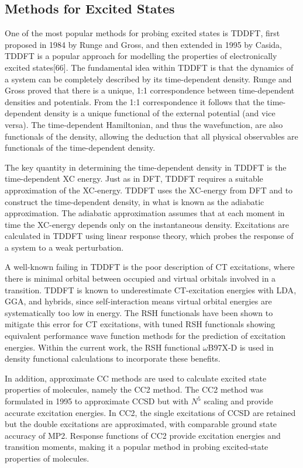 \subsection{Methods for Excited States}\label{section: photo_methods}
One of the most popular methods for probing excited states is \acf{TDDFT}, first proposed in 1984 by Runge and Gross, and then extended in 1995 by Casida, TDDFT is a popular approach for modelling the properties of electronically excited states[66]. The fundamental idea within TDDFT is that the dynamics of a system can be completely described by its time-dependent density. Runge and Gross proved that there is a unique, 1:1 correspondence between time-dependent densities and potentials.\cite{Runge1984}  From the 1:1 correspondence it follows that the time-dependent density is a unique functional of the external potential (and vice versa). The time-dependent Hamiltonian, and thus the wavefunction, are also functionals of the density, allowing the deduction that all physical observables are functionals of the time-dependent density.

The key quantity in determining the time-dependent density in \ac{TDDFT} is the time-dependent \acf{XC} energy. Just as in \ac{DFT}, \ac{TDDFT} requires a suitable approximation of the \ac{XC}-energy. \ac{TDDFT} uses the \ac{XC}-energy from \ac{DFT} and to construct the time-dependent density, in what is known as the adiabatic approximation. The adiabatic approximation assumes that at each moment in time the \ac{XC}-energy depends only on the instantaneous density. Excitations are calculated in \ac{TDDFT} using linear response theory, which probes the response of a system to a weak perturbation.

A well-known failing in \ac{TDDFT} is the poor description of \acf{CT} excitations, where there is minimal orbital between occupied and virtual orbitals involved in a transition. TDDFT is known to underestimate \ac{CT}-excitation energies with \ac{LDA}, \ac{GGA}, and hybrids, since self-interaction means virtual orbital energies are systematically too low in energy. The \ac{RSH} functionals have been shown to mitigate this error for \ac{CT} excitations, with tuned \ac{RSH} functionals showing equivalent performance wave function methods for the prediction of excitation energies.\cite{Stein2009a,Kuritz2011,Kronik2012a} Within the current work, the \ac{RSH} functional $\omega$B97X-D is used in density functional calculations to incorporate these benefits.\cite{Chai2008} 

In addition, approximate \ac{CC} methods are used to calculate excited state properties of molecules, namely the \ac{CC}2 method. The \ac{CC}2 method was formulated in 1995 to approximate CCSD but with $N^{5}$ scaling and provide accurate excitation energies.\cite{Christiansen1995} In \ac{CC}2, the single excitations of CCSD are retained but the double excitations are approximated, with comparable ground state accuracy of MP2.\cite{Hattig2005} Response functions of \ac{CC}2 provide excitation energies and transition moments, making it a popular method in probing excited-state properties of molecules.\cite{Sneskov2012}

